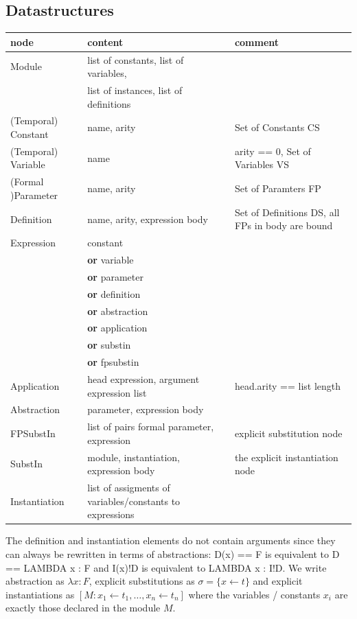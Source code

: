 \documentclass[a4paper]{article}
\newcommand{\dor}{\textbf{or}}
\newcommand{\fpsubstin}[1]{\{#1\}}
\newcommand{\substin}[2]{[#1:#2]}
\newcommand{\fpwith}{\leftarrow}
\newcommand{\iwith}{\leftarrow}
\begin{document}
\subsection{Datastructures}
\label{sec:ds}

\begin{tabular}{lp{}p{}}
  node & content & comment \\
  \hline
  Module & list of constants, list of variables, & \\
       & list of instances, list of definitions & \\
  (Temporal) Constant  & name, arity & Set of Constants CS \\
  (Temporal) Variable  & name & arity == 0, Set of Variables VS \\
  (Formal )Parameter & name, arity & Set of Paramters FP \\
  Definition & name, arity, expression body & Set of Definitions DS,
                                              all FPs in body are bound \\
  Expression  & constant    & \\
       & \dor{} variable    & \\
       & \dor{} parameter   & \\
       & \dor{} definition  & \\
       & \dor{} abstraction & \\
       & \dor{} application & \\
       & \dor{} substin     & \\
       & \dor{} fpsubstin   & \\
  Application & head expression, argument expression list & head.arity == list length\\
  Abstraction & parameter, expression body & \\
  FPSubstIn  & list of pairs formal parameter, expression
                 & explicit substitution node \\
  SubstIn     & module, instantiation, expression body
                 & the explicit instantiation node \\
  Instantiation & list of assigments of variables/constants to expressions& \\
\end{tabular}

The definition and instantiation elements do not contain arguments since they
can always be rewritten in terms of abstractions: D(x) == F is equivalent to
D == LAMBDA x : F and I(x)!D is equivalent to LAMBDA x : I!D. We write
abstraction as $\lambda x : F$, explicit substitutions as
$\sigma = \fpsubstin{x \fpwith t}$ and explicit instantiations as
$\substin{M}{x_1 \iwith t_1,\ldots,x_n \iwith t_n}$ where the variables /
constants $x_i$ are exactly those declared in the module $M$.
\end{document}
